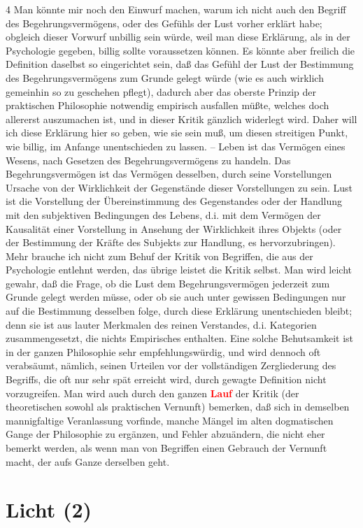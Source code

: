 \documentclass[a4paper,12pt,twoside]{book}
\newcommand{\match}[1]{\textcolor{red}{\textbf{#1}}}
\newcommand{\unnumberedsection}[1]{
	\section*{#1}
	\addcontentsline{toc}{section}{#1}
	\markright{#1}
}
\begin{document}
	4 Man könnte mir noch den Einwurf machen, warum ich nicht auch den Begriff des Begehrungsvermögens, oder des Gefühls der Lust vorher erklärt habe; obgleich dieser Vorwurf unbillig sein würde, weil man diese Erklärung, als in der Psychologie gegeben, billig sollte voraussetzen können. Es könnte aber freilich die Definition daselbst so eingerichtet sein, daß das Gefühl der Lust der Bestimmung des Begehrungsvermögens zum Grunde gelegt würde (wie es auch wirklich gemeinhin so zu geschehen pflegt), dadurch aber das oberste Prinzip der praktischen Philosophie notwendig empirisch ausfallen müßte, welches doch allererst auszumachen ist, und in dieser Kritik gänzlich widerlegt wird. Daher will ich diese Erklärung hier so geben, wie sie sein muß, um diesen streitigen Punkt, wie billig, im Anfange unentschieden zu lassen. – Leben ist das Vermögen eines Wesens, nach Gesetzen des Begehrungsvermögens zu handeln. Das Begehrungsvermögen ist das Vermögen desselben, durch seine Vorstellungen Ursache von der Wirklichkeit der Gegenstände dieser Vorstellungen zu sein. Lust ist die Vorstellung der Übereinstimmung des Gegenstandes oder der Handlung mit den subjektiven Bedingungen des Lebens, d.i. mit dem Vermögen der Kausalität einer Vorstellung in Ansehung der Wirklichkeit ihres Objekts (oder der Bestimmung der Kräfte des Subjekts zur Handlung, es hervorzubringen). Mehr brauche ich nicht zum Behuf der Kritik von Begriffen, die aus der Psychologie entlehnt werden, das übrige leistet die Kritik selbst. Man wird leicht gewahr, daß die Frage, ob die Lust dem Begehrungsvermögen jederzeit zum Grunde gelegt werden müsse, oder ob sie auch unter gewissen Bedingungen nur auf die Bestimmung desselben folge, durch diese Erklärung unentschieden bleibt; denn sie ist aus lauter Merkmalen des reinen Verstandes, d.i. Kategorien zusammengesetzt, die nichts Empirisches enthalten. Eine solche Behutsamkeit ist in der ganzen Philosophie sehr empfehlungswürdig, und wird dennoch oft verabsäumt, nämlich, seinen Urteilen vor der vollständigen Zergliederung des Begriffs, die oft nur sehr spät erreicht wird, durch gewagte Definition nicht vorzugreifen. Man wird auch durch den ganzen \match{Lauf} der Kritik (der theoretischen sowohl als praktischen Vernunft) bemerken, daß sich in demselben mannigfaltige Veranlassung vorfinde, manche Mängel im alten dogmatischen Gange der Philosophie zu ergänzen, und Fehler abzuändern, die nicht eher bemerkt werden, als wenn man von Begriffen einen Gebrauch der Vernunft macht, der aufs Ganze derselben geht. 
	
	\unnumberedsection{Licht (2)} 
\end{document}
